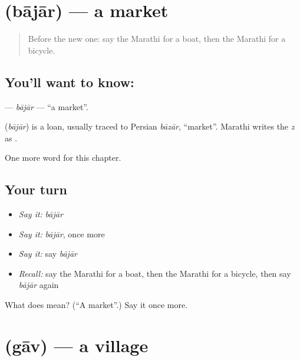 \section[\texorpdfstring{\mr{बाजार} (bājār)}{बाजार (bājār)}]{ (bājār) — a market}

\label{lesson:MR-C115-bajar}



\begin{quote}
Before the new one: say the Marathi for a boat, then the Marathi for a bicycle.
\end{quote}

\subsection*{You'll want to know: }
\textbf{} — \emph{bājār} — \textquotedblleft{}a market\textquotedblright{}.

\begin{cousinweb}
\textbf{} (\emph{bājār}) is a loan, usually traced to Persian \emph{bāzār}, \textquotedblleft{}market\textquotedblright{}. Marathi writes the \emph{z} as \textbf{}.
\end{cousinweb}

\begin{grammarlens}[title={What you've built}]
One more word for this chapter.
\end{grammarlens}

\subsection*{Your turn}
\begin{itemize}
\raggedright
  \item \emph{Say it:} \emph{bājār}
  \item \emph{Say it:} \emph{bājār}, once more
  \item \emph{Say it:} say \emph{bājār}
  \item \emph{Recall:} say the Marathi for a boat, then the Marathi for a bicycle, then say \emph{bājār} again
\end{itemize}

\begin{tcolorbox}[breakable,colback=teal!4,colframe=teal!35!black,title={Before you move on}]
What does  mean? (\textquotedblleft{}A market\textquotedblright{}.) Say it once more.
\end{tcolorbox}
\section[\texorpdfstring{\mr{गाव} (gāv)}{गाव (gāv)}]{ (gāv) — a village}

